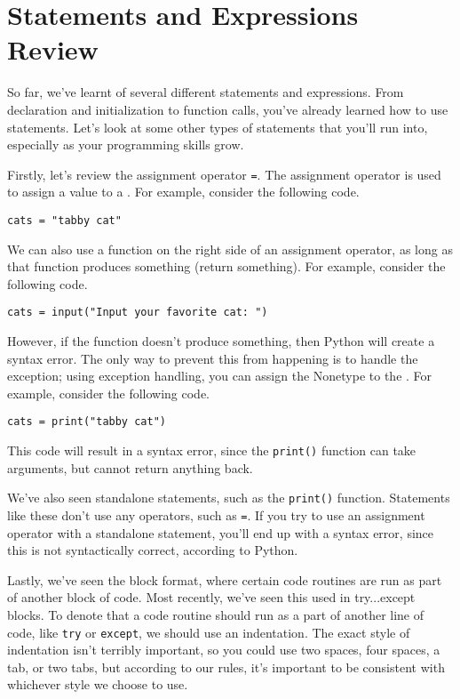 \section{Statements and Expressions Review}
So far, we've learnt of several different statements and expressions. From  declaration and initialization to function calls, you've already learned how to use statements. Let's look at some other types of statements that you'll run into, especially as your programming skills grow.\par
Firstly, let's review the assignment operator \verb|=|. The assignment operator is used to assign a value to a . For example, consider the following code.\par
\begin{lstlisting}[style=pippython]
cats = "tabby cat"
\end{lstlisting}
We can also use a function on the right side of an assignment operator, as long as that function produces something (return something). For example, consider the following code.\par
\begin{lstlisting}[style=pippython]
cats = input("Input your favorite cat: ")
\end{lstlisting}
However, if the function doesn't produce something, then Python will create a syntax error. The only way to prevent this from happening is to handle the exception; using exception handling, you can assign the Nonetype to the . For example, consider the following code.\par
\begin{lstlisting}[style=pippython]
cats = print("tabby cat")
\end{lstlisting}
This code will result in a syntax error, since the \verb|print()| function can take arguments, but cannot return anything back.\par
We've also seen standalone statements, such as the \verb|print()| function. Statements like these don't use any operators, such as \verb|=|. If you try to use an assignment operator with a standalone statement, you'll end up with a syntax error, since this is not syntactically correct, according to Python.\par
Lastly, we've seen the block format, where certain code routines are run as part of another block of code. Most recently, we've seen this used in try...except blocks. To denote that a code routine should run as a part of another line of code, like \verb|try| or \verb|except|, we should use an indentation. The exact style of indentation isn't terribly important, so you could use two spaces, four spaces, a tab, or two tabs, but according to our  rules, it's important to be consistent with whichever style we choose to use.\par
